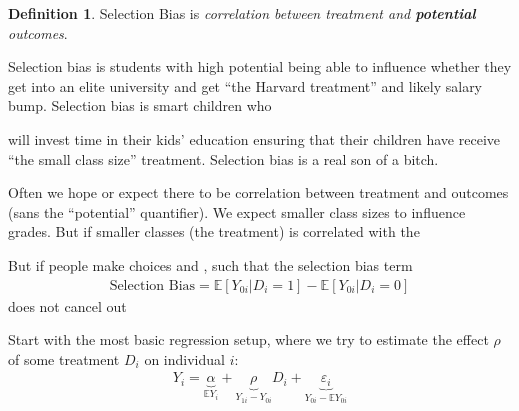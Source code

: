 \documentclass[12pt]{article}
\theoremstyle{plain}
\theoremstyle{definition}
\newtheorem{defn}[thm]{Definition}
\theoremstyle{remark}
\begin{document}
\begin{defn}
Selection Bias is \emph{correlation between treatment and
  \textbf{potential} outcomes}.
\end{defn}
Selection bias is students with high potential being able to influence
whether they get into an elite university and get ``the Harvard
treatment'' and likely salary bump. Selection bias is smart children who

will invest time in their kids' education ensuring that their children
have receive ``the small class size'' treatment. Selection bias is a
real son of a bitch.

Often we hope or expect there to be
correlation between treatment and outcomes (sans the ``potential''
quantifier). We expect smaller class sizes to influence grades. But if smaller classes (the treatment) is correlated with the 

But if people make choices and 
, such that the selection bias term
\begin{align*}
  \text{Selection Bias} =
  \mathbb{E}[Y_{0i} | D_i = 1] - \mathbb{E}[Y_{0i} | D_i = 0]
\end{align*}
does not cancel out

Start with the most basic regression setup, where we try to estimate the
effect $\rho$ of some treatment $D_i$ on individual $i$:
\begin{align}
  Y_i =
  \underbrace{\alpha}_{\mathbb{E}Y_i}
  + \underbrace{\rho}_{Y_{1i} - Y_{0i}} D_i
  + \underbrace{\varepsilon_i}_{Y_{0i}-\mathbb{E}Y_{0i}}
  \label{basic}
\end{align}






\end{document}
